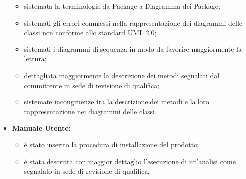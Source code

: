 \begin{itemize}
\begin{itemize}
		\item sistemata la terminologia da Package\g{} a Diagramma dei Package\g{};		
		\item sistemati gli errori commessi nella rappresentazione dei diagrammi delle classi non conforme allo standard UML 2.0;
		\item sistemati i diagrammi di sequenza in modo da favorire maggiormente la lettura;
		\item dettagliata maggiormente la descrizione dei metodi segnalati dal committente in sede di revisione di qualifica;
		\item sistemate incongruenze tra la descrizione dei metodi e la loro rappresentazione nei diagrammi delle classi. 
	\end{itemize}
\item  \textbf{Manuale Utente:}
	\begin{itemize}
		\item è stato inserito la procedura di installazione del prodotto;
		\item è stata descritta con maggior dettaglio l'esecuzione di un'analisi come segnalato in sede di revisione di qualifica.
	\end{itemize}
\end{itemize}

